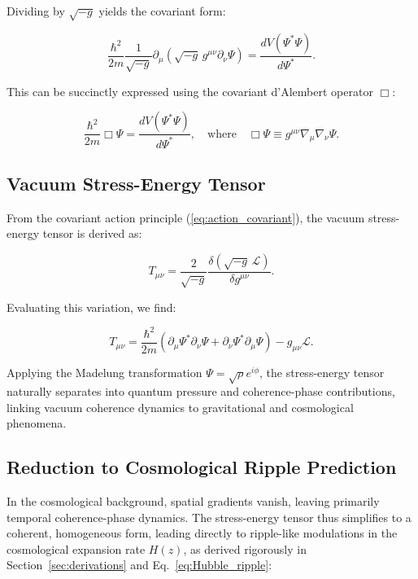 Dividing by $\sqrt{-g}$ yields the covariant form:

\begin{equation}
\frac{\hbar^2}{2m}\frac{1}{\sqrt{-g}}\partial_\mu\left(\sqrt{-g}\,g^{\mu\nu}\partial_\nu\Psi\right) = \frac{dV(\Psi^*\Psi)}{d\Psi^*}.
\label{eq:covariant_field_eq}
\end{equation}

This can be succinctly expressed using the covariant d'Alembert operator $\Box$:

\begin{equation}
\frac{\hbar^2}{2m}\Box\Psi = \frac{dV(\Psi^*\Psi)}{d\Psi^*},\quad\text{where}\quad \Box\Psi \equiv g^{\mu\nu}\nabla_\mu\nabla_\nu\Psi.
\label{eq:covariant_dalembert_eq}
\end{equation}

\subsection{Vacuum Stress-Energy Tensor}

From the covariant action principle (\ref{eq:action_covariant}), the vacuum stress-energy tensor is derived as:

\begin{equation}
T_{\mu\nu} = \frac{2}{\sqrt{-g}}\frac{\delta(\sqrt{-g}\,\mathcal{L})}{\delta g^{\mu\nu}}.
\label{eq:stress_energy_definition}
\end{equation}

Evaluating this variation, we find:

\begin{equation}
T_{\mu\nu} = \frac{\hbar^2}{2m}\left(\partial_\mu\Psi^*\partial_\nu\Psi + \partial_\nu\Psi^*\partial_\mu\Psi\right) - g_{\mu\nu}\mathcal{L}.
\label{eq:stress_energy}
\end{equation}

Applying the Madelung transformation $\Psi=\sqrt{\rho}e^{i\phi}$, the stress-energy tensor naturally separates into quantum pressure and coherence-phase contributions, linking vacuum coherence dynamics to gravitational and cosmological phenomena.

\subsection{Reduction to Cosmological Ripple Prediction}

In the cosmological background, spatial gradients vanish, leaving primarily temporal coherence-phase dynamics. The stress-energy tensor thus simplifies to a coherent, homogeneous form, leading directly to ripple-like modulations in the cosmological expansion rate $H(z)$, as derived rigorously in Section~\ref{sec:derivations} and Eq.~\eqref{eq:Hubble_ripple}:

